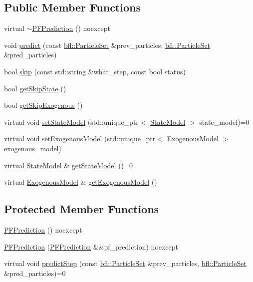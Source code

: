 \subsection*{Public Member Functions}
\begin{DoxyCompactItemize}
\item 
virtual \mbox{\hyperlink{classbfl_1_1PFPrediction_a2183ecd8522d4a3f780c93256d10ecf8}{$\sim$\+P\+F\+Prediction}} () noexcept
\item 
void \mbox{\hyperlink{classbfl_1_1PFPrediction_a129dcd1cccd2da9827ef0c49c90b9345}{predict}} (const \mbox{\hyperlink{classbfl_1_1ParticleSet}{bfl\+::\+Particle\+Set}} \&prev\+\_\+particles, \mbox{\hyperlink{classbfl_1_1ParticleSet}{bfl\+::\+Particle\+Set}} \&pred\+\_\+particles)
\item 
bool \mbox{\hyperlink{classbfl_1_1PFPrediction_a364cc35a151e5298c4024d681f3e04d9}{skip}} (const std\+::string \&what\+\_\+step, const bool status)
\item 
bool \mbox{\hyperlink{classbfl_1_1PFPrediction_a323ca5612dd7ad924fd448a629359ad2}{get\+Skip\+State}} ()
\item 
bool \mbox{\hyperlink{classbfl_1_1PFPrediction_a432b8e84dbf00432158aa82312386d63}{get\+Skip\+Exogenous}} ()
\item 
virtual void \mbox{\hyperlink{classbfl_1_1PFPrediction_ac39683650d7f89c59f1426dd7743354e}{set\+State\+Model}} (std\+::unique\+\_\+ptr$<$ \mbox{\hyperlink{classbfl_1_1StateModel}{State\+Model}} $>$ state\+\_\+model)=0
\item 
virtual void \mbox{\hyperlink{classbfl_1_1PFPrediction_ada843698204584e97d4ff6728c8e8264}{set\+Exogenous\+Model}} (std\+::unique\+\_\+ptr$<$ \mbox{\hyperlink{classbfl_1_1ExogenousModel}{Exogenous\+Model}} $>$ exogenous\+\_\+model)
\item 
virtual \mbox{\hyperlink{classbfl_1_1StateModel}{State\+Model}} \& \mbox{\hyperlink{classbfl_1_1PFPrediction_a1a0f7a1d66a6849c2de10459c6b8f8ac}{get\+State\+Model}} ()=0
\item 
virtual \mbox{\hyperlink{classbfl_1_1ExogenousModel}{Exogenous\+Model}} \& \mbox{\hyperlink{classbfl_1_1PFPrediction_aefa127a440649447e8ac659ef65b7a2a}{get\+Exogenous\+Model}} ()
\end{DoxyCompactItemize}
\subsection*{Protected Member Functions}
\begin{DoxyCompactItemize}
\item 
\mbox{\hyperlink{classbfl_1_1PFPrediction_a27c90e025bf5376cedd5dfc9657fb1b9}{P\+F\+Prediction}} () noexcept
\item 
\mbox{\hyperlink{classbfl_1_1PFPrediction_a3a8645cb4fe088e7a3a2dc1e64aaca35}{P\+F\+Prediction}} (\mbox{\hyperlink{classbfl_1_1PFPrediction}{P\+F\+Prediction}} \&\&pf\+\_\+prediction) noexcept
\item 
virtual void \mbox{\hyperlink{classbfl_1_1PFPrediction_ade49953e2beed6d12f9716254ccbba71}{predict\+Step}} (const \mbox{\hyperlink{classbfl_1_1ParticleSet}{bfl\+::\+Particle\+Set}} \&prev\+\_\+particles, \mbox{\hyperlink{classbfl_1_1ParticleSet}{bfl\+::\+Particle\+Set}} \&pred\+\_\+particles)=0
\end{DoxyCompactItemize}

